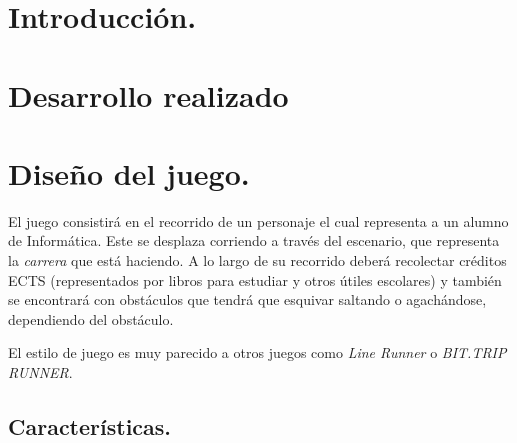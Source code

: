 \documentclass[12 pt, a4paper, twoside]{article}
\begin{document}
\section{Introducción.}

\section{Desarrollo realizado}
\section{Diseño del juego.}

El juego consistirá en el recorrido de un personaje el cual representa a un
alumno de Informática. Este se desplaza corriendo a través del escenario, que
representa la {\em carrera} que está haciendo. A lo largo de su recorrido
deberá recolectar créditos ECTS (representados por libros para estudiar y otros
útiles escolares) y también se encontrará con obstáculos que tendrá que
esquivar saltando o agachándose, dependiendo del obstáculo.

El estilo de juego es muy parecido a otros juegos como {\em Line Runner} o {\em
BIT.TRIP RUNNER}.

\clearpage

\subsection{Características.}
\end{document}
